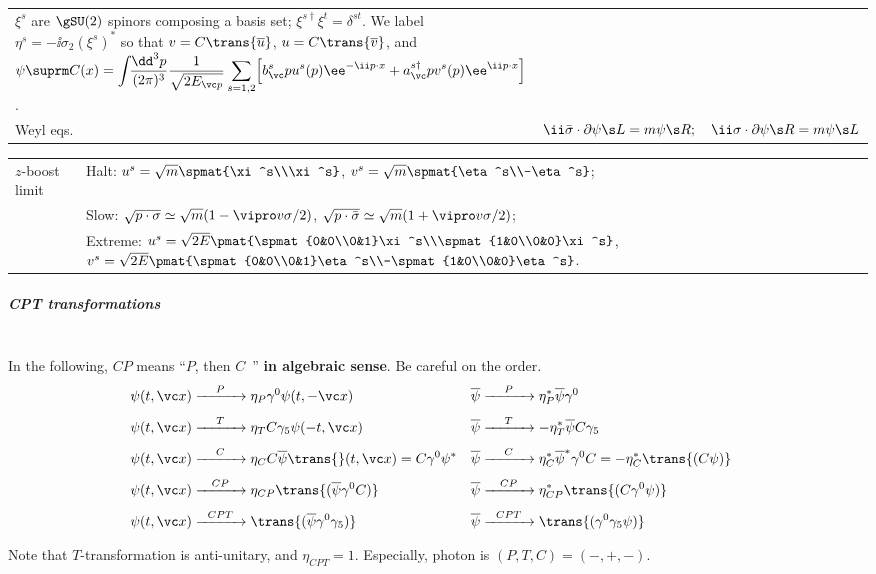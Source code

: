 \begin{tabular}{l@{ :\ \ }l}
\parbox[t]{26.4em}{
$\xi^s$ are $\gSU(2)$ spinors composing a basis set; $\xi^{s\dagger}\xi^t=\delta^{st}$.\\
We label $\eta^s=-\ii\sigma_2(\xi^s)^*$ so that $v=C\trans{\overline u}$, $u=C\trans{\overline v}$, and
\\\hfill
$\displaystyle\psi\suprm C(x)=\intdP{p} \frac{1}{\sqrt{2E_{\vc p}}}
               \sum_{s=1,2}\Bigl[b^s_\vc p u^s(p)\ee^{-\ii p\cdot x}
                + a^{s\dagger}_\vc p v^s(p)\ee^{\ii p\cdot x}\Bigr]$.
}
\\
Weyl eqs. & $\ii\bar\sigma\cdot\partial\psi\s L=m\psi\s R;\quad
             \ii\sigma\cdot\partial\psi\s R=m\psi\s L$\\
\end{tabular}


\begin{tabular}{l@{ :\ \ \ }l}
$z$-boost limit &
Halt: $u^s=\sqrt{m}\spmat{\xi^s\\\xi^s}$, $v^s=\sqrt{m}\spmat{\eta^s\\-\eta^s}$;\\
&Slow:
$\sqrt{p\cdot\sigma}\simeq \sqrt m(1-\vipro v\sigma/2)$,
$\sqrt{p\cdot\bar\sigma}\simeq \sqrt m(1+\vipro v\sigma/2)$;\\
&Extreme:
 $u^s=\sqrt{2E}\pmat{\spmat{0&0\\0&1}\xi^s\\\spmat{1&0\\0&0}\xi^s}$,
 $v^s=\sqrt{2E}\pmat{\spmat{0&0\\0&1}\eta^s\\-\spmat{1&0\\0&0}\eta^s}$.
\end{tabular}

\subparagraph{CPT transformations}\mbox{}\\
In the following, $CP$ means ``$P$, then $C$\ '' {\bf in algebraic sense}. Be careful on the order.
\begin{align*}
 \psi(t,\vc x) &\xrightarrow[\hskip30pt]{P} \eta_P  \G0\psi(t,-\vc x)&
 \overline\psi       &\xrightarrow[\hskip30pt]{P} \eta_P^* \overline\psi\G0\\
 \psi(t,\vc x) &\xrightarrow[\hskip30pt]{T} \eta_T C\G5\psi(-t,\vc x)&
 \overline\psi       &\xrightarrow[\hskip30pt]{T} -\eta_T^* \overline\psi C\G5\\
 \psi(t,\vc x) &\xrightarrow[\hskip30pt]{C} \eta_C   C\overline\psi\trans{}(t,\vc x)=C\G0\psi^*&
 \overline\psi       &\xrightarrow[\hskip30pt]{C} \eta_C^* \overline\psi^*\G0C = -\eta_C^*\trans{(C\psi)}\\
 \psi(t,\vc x) &\xrightarrow[\hskip30pt]{CP} \eta_{CP}\trans{(\overline\psi \G0C)}&
 \overline\psi       &\xrightarrow[\hskip30pt]{CP} \eta_{CP}^*\trans{(C\G0\psi)}\\
 \psi(t,\vc x) &\xrightarrow[\hskip30pt]{CPT} \trans{(\overline\psi\G0\G5)}&
 \overline\psi       &\xrightarrow[\hskip30pt]{CPT} \trans{(\G0\G5\psi)}&
\end{align*}
Note that $T$-transformation is anti-unitary, and $\eta_{CPT}=1$.
Especially, photon is $(P,T,C)=(-,+,-)$.

